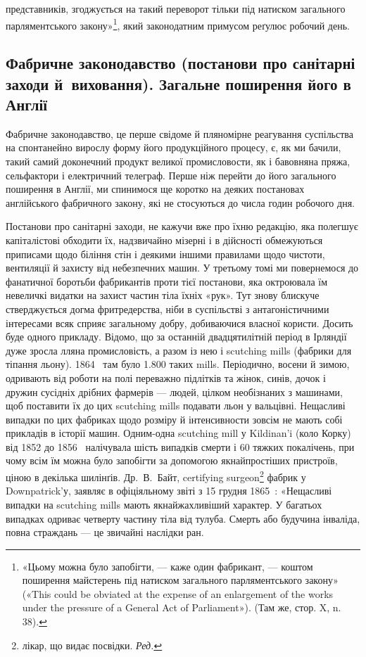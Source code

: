 \parcont{}  %
представників, згоджується на такий переворот тільки під натиском загального парляментського
закону»\footnote{
«Цьому можна було запобігти, — каже один фабрикант, — коштом
поширення майстерень під натиском загального парляментського закону»
(«This could be obviated at the expense of an enlargement of the works
under the pressure of a General Act of Parliament»). (Там же, стор. X,
n. 38).
}, який законодатним
примусом реґулює робочий день.

\subsection{Фабричне законодавство (постанови про санітарні заходи й~виховання). Загальне поширення його в
Англії}

Фабричне законодавство, це перше свідоме й пляномірне реагування суспільства на спонтанейно вирослу
форму його продукційного процесу, є, як ми бачили, такий самий доконечний продукт великої
промисловости, як і бавовняна пряжа, сельфактори
і електричний телеграф. Перше ніж перейти до його загального
поширення в Англії, ми спинимося ще коротко на деяких постановах англійського фабричного закону, які
не стосуються до
числа годин робочого дня.

Постанови про санітарні заходи, не кажучи вже про їхню
редакцію, яка полегшує капіталістові обходити їх, надзвичайно
мізерні і в дійсності обмежуються приписами щодо біління стін
і деякими іншими правилами щодо чистоти, вентиляції й захисту
від небезпечних машин. У третьому томі ми повернемося до фанатичної боротьби фабрикантів проти тієї
постанови, яка октроювала їм невеличкі видатки на захист частин тіла їхніх «рук».
Тут знову блискуче стверджується догма фритредерства, ніби в
суспільстві з антагоністичними інтересами всяк сприяє загальному добру, добиваючися власної користи.
Досить буде одного
прикладу. Відомо, що за останній двадцятилітній період в Ірляндії дуже зросла лляна промисловість, а
разом із нею і scutching
mills (фабрики для тіпання льону). 1864~ там було \num{1.800} таких
mills. Періодично, восени й зимою, одривають від роботи на
полі переважно підлітків та жінок, синів, дочок і дружин сусідніх дрібних фармерів — людей, цілком
необізнаних з машинами,
щоб поставити їх до цих scutching mills подавати льон у вальцівні.
Нещасливі випадки по цих фабриках щодо розміру й інтенсивности зовсім не мають собі прикладів в
історії машин. Одним-одна
scutching mill у Kildinan’i (коло Корку) від 1852 до 1856~
налічувала шість випадків смерти і 60 тяжких покалічень, при
чому всім їм можна було запобігти за допомогою якнайпростіших пристроїв, ціною в декілька шилінґів.
Др.~В.~Байт, certifying
surgeon\footnote*{
лікар, що видає посвідки. \emph{Ред.}
} фабрик у Downpatrick’у, заявляє в офіціяльному
звіті з 15 грудня 1865~: «Нещасливі випадки на scutching
mills мають якнайжахливіший характер. У багатьох випадках одриває четверту частину тіла від тулуба.
Смерть або будучина інваліда, повна страждань — це звичайні наслідки ран.
\parbreak{}  %
